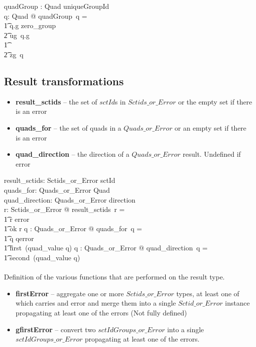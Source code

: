 \documentclass{article}
\begin{document}
\begin{axdef}
quadGroup : Quad \fun uniqueGroupId \\
\where 
\forall q: Quad @ quadGroup~q =  \\
\t1 \IF q.g \neq zero\_group \THEN \\
\t2 ug~q.g \\
\t1 \ELSE \\
\t2 zg~q 
\end{axdef}


\subsection{Result transformations}
\begin{itemize}[noitemsep,nolistsep]
\item \textbf{result\_sctids} -- the set of $sctId$s in $Sctids\_or\_Error$ or the empty set if there is an error
\item \textbf{quads\_for} -- the set of quads in a $Quads\_or\_Error$ or an empty set if there is an error
\item \textbf{quad\_direction} -- the direction of a $Quads\_or\_Error$ result.  Undefined if error
\end{itemize}
\begin{axdef}
   result\_sctids: Sctids\_or\_Error \fun \power sctId \\
   quads\_for: Quads\_or\_Error \fun \power Quad  \\
   quad\_direction: Quads\_or\_Error \pfun direction \\
\where
   \forall r: Sctids\_or\_Error @ result\_sctids~r = \\
\t1 \IF r \in \ran error \THEN \emptyset \\
\t1 \ELSE ok \inv r
\also
   \forall q : Quads\_or\_Error @ quads\_for~q = \\
\t1 \IF q \in \ran qerror  \THEN \emptyset \\
\t1 \ELSE first~(quad\_value \inv q)
\also
   \forall q : Quads\_or\_Error @ quad\_direction~q = \\
\t1 second~(quad\_value \inv q)
\end{axdef}



\paragraph{}
Definition of the various functions that are performed on the result type. \\
\begin{itemize}[noitemsep,nolistsep]
\item \textbf{firstError} -- aggregate one or more $Sctids\_or\_Error$ types, at least one of which carries and error and merge them into a single $Sctid\_or\_Error$ instance propagating at least one of the errors (Not fully defined)
\item \textbf{gfirstError} -- convert two $sctIdGroups\_or\_Error$ into a single $sctIdGroups\_or\_Error$ propagating at least one of the errors.
\end{itemize}
\end{document}
